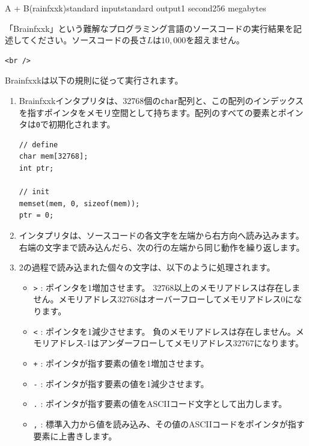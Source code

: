 \begin{problem}{A + B(rainfxxk)}{standard input}{standard output}{1 second}{256 megabytes}


「Brainfxxk」という難解なプログラミング言語のソースコードの実行結果を記述してください。ソースコードの長さ$L$は$10,000$を超えません。

\begin{lstlisting}
<br />
\end{lstlisting}

Brainfxxkは以下の規則に従って実行されます。

\begin{enumerate}
\item 
Brainfxxkインタプリタは、32768個の\texttt{char}配列と、この配列のインデックスを指すポインタをメモリ空間として持ちます。配列のすべての要素とポインタは\texttt{0}で初期化されます。

\begin{lstlisting}
// define
char mem[32768];
int ptr;

// init
memset(mem, 0, sizeof(mem));
ptr = 0;
\end{lstlisting}

\item 
インタプリタは、ソースコードの各文字を左端から右方向へ読み込みます。右端の文字まで読み込んだら、次の行の左端から同じ動作を繰り返します。


\item 
2の過程で読み込まれた個々の文字は、以下のように処理されます。

\begin{itemize}
\item 
\texttt{>} : ポインタを1増加させます。
32768以上のメモリアドレスは存在しません。メモリアドレス32768はオーバーフローしてメモリアドレス0になります。


\item 
\texttt{<} : ポインタを1減少させます。
負のメモリアドレスは存在しません。メモリアドレス-1はアンダーフローしてメモリアドレス32767になります。


\item 
\texttt{+} : ポインタが指す要素の値を1増加させます。


\item 
\texttt{-} : ポインタが指す要素の値を1減少させます。


\item 
\texttt{.} : ポインタが指す要素の値をASCIIコード文字として出力します。


\item 
\texttt{,} : 標準入力から値を読み込み、その値のASCIIコードをポインタが指す要素に上書きします。



\end{itemize}
\end{enumerate}
\end{problem}
